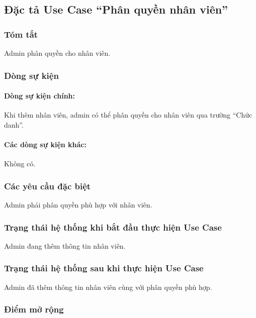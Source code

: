 \subsection{Đặc tả Use Case ``Phân quyền nhân viên''}

\subsubsection{Tóm tắt}
Admin phân quyền cho nhân viên.

\subsubsection{Dòng sự kiện}
\paragraph{\textbf{Dòng sự kiện chính:}}
Khi thêm nhân viên, admin có thể phân quyền cho nhân viên qua trường ``Chức danh''.

\paragraph{\textbf{Các dòng sự kiện khác:}}
Không có.

\subsubsection{Các yêu cầu đặc biệt}
Admin phải phân quyền phù hợp với nhân viên.

\subsubsection{Trạng thái hệ thống khi bắt đầu thực hiện Use Case}
Admin đang thêm thông tin nhân viên.

\subsubsection{Trạng thái hệ thống sau khi thực hiện Use Case}
Admin đã thêm thông tin nhân viên cùng với phân quyền phù hợp.

\subsubsection{Điểm mở rộng}